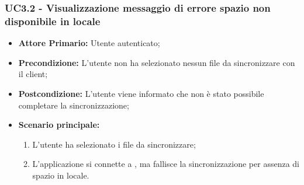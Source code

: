 \subsubsection{UC3.2 - Visualizzazione messaggio di errore spazio non disponibile in locale}
\label{UC3.2}
\begin{itemize}
\item \textbf{Attore Primario:} Utente autenticato;
\item \textbf{Precondizione:} L'utente non ha selezionato nessun file da sincronizzare con il client;
\item \textbf{Postcondizione:} L'utente viene informato che non è stato possibile completare la sincronizzazione;
\item \textbf{Scenario principale:}
    \begin{enumerate}
    \item L'utente ha selezionato i file da sincronizzare;
    \item L'applicazione si connette a , ma fallisce la sincronizzazione per assenza di spazio in locale.
    \end{enumerate}
\end{itemize}